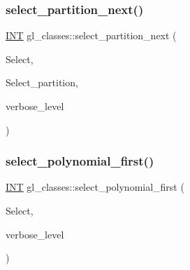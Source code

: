 \subsubsection{\texorpdfstring{select\+\_\+partition\+\_\+next()}{select\_partition\_next()}}
{\footnotesize\ttfamily \mbox{\hyperlink{galois_8h_a09fddde158a3a20bd2dcadb609de11dc}{I\+NT}} gl\+\_\+classes\+::select\+\_\+partition\+\_\+next (\begin{DoxyParamCaption}\item[{\mbox{\hyperlink{galois_8h_a09fddde158a3a20bd2dcadb609de11dc}{I\+NT}} $\ast$}]{Select,  }\item[{\mbox{\hyperlink{galois_8h_a09fddde158a3a20bd2dcadb609de11dc}{I\+NT}} $\ast$}]{Select\+\_\+partition,  }\item[{\mbox{\hyperlink{galois_8h_a09fddde158a3a20bd2dcadb609de11dc}{I\+NT}}}]{verbose\+\_\+level }\end{DoxyParamCaption})}

\mbox{\label{classgl__classes_a9d3a3fcb30560a45bad78b67f075a760}} 
\subsubsection{\texorpdfstring{select\+\_\+polynomial\+\_\+first()}{select\_polynomial\_first()}}
{\footnotesize\ttfamily \mbox{\hyperlink{galois_8h_a09fddde158a3a20bd2dcadb609de11dc}{I\+NT}} gl\+\_\+classes\+::select\+\_\+polynomial\+\_\+first (\begin{DoxyParamCaption}\item[{\mbox{\hyperlink{galois_8h_a09fddde158a3a20bd2dcadb609de11dc}{I\+NT}} $\ast$}]{Select,  }\item[{\mbox{\hyperlink{galois_8h_a09fddde158a3a20bd2dcadb609de11dc}{I\+NT}}}]{verbose\+\_\+level }\end{DoxyParamCaption})}

\mbox{\label{classgl__classes_af02618085f548665644d9e679abb0d1f}} 
